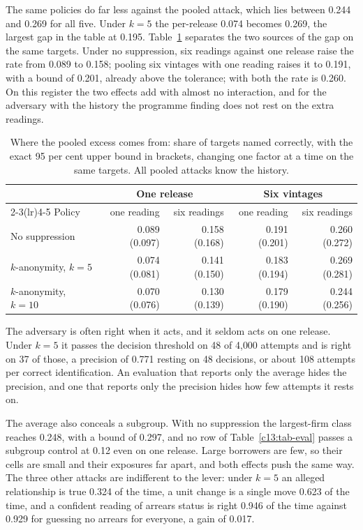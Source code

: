 The same policies do far less against the pooled attack, which lies between 0.244
and 0.269 for all five. Under $k=5$ the per-release 0.074 becomes 0.269, the largest
gap in the table at 0.195.
Table~\ref{c13:tab-decomp} separates the two sources of the gap on the same targets.
Under no suppression, six readings against one release raise the rate from 0.089 to
0.158; pooling six vintages with one reading raises it to 0.191, with a bound of
0.201, already above the tolerance; with both the rate is 0.260. On this register
the two effects add with almost no interaction, and for the adversary with the
history the programme finding does not rest on the extra readings.

\begin{table}[ht]
\centering
\caption{Where the pooled excess comes from: share of targets named correctly, with
the exact 95 per cent upper bound in brackets, changing one factor at a time on the
same targets. All pooled attacks know the history.}
\label{c13:tab-decomp}
\small\setlength{\tabcolsep}{4pt}
\begin{tabular}{lrrrr}
\toprule
 & \multicolumn{2}{c}{One release} & \multicolumn{2}{c}{Six vintages} \\
\cmidrule(lr){2-3}\cmidrule(lr){4-5}
Policy & one reading & six readings & one reading & six readings \\
\midrule
No suppression       & 0.089 (0.097) & 0.158 (0.168) & 0.191 (0.201) & 0.260 (0.272) \\
$k$-anonymity, $k=5$ & 0.074 (0.081) & 0.141 (0.150) & 0.183 (0.194) & 0.269 (0.281) \\
$k$-anonymity, $k=10$& 0.070 (0.076) & 0.130 (0.139) & 0.179 (0.190) & 0.244 (0.256) \\
\bottomrule
\end{tabular}
\end{table}

The adversary is often right when it acts, and it seldom acts on one release. Under
$k=5$ it passes the decision threshold on 48 of 4{,}000 attempts and is right on 37 of
those, a precision of 0.771 resting on 48 decisions, or about 108 attempts per
correct identification.
An evaluation that reports only the average hides the precision, and one that reports
only the precision hides how few attempts it rests on.

The average also conceals a subgroup. With no suppression the largest-firm class
reaches 0.248, with a bound of 0.297, and no row of Table~\ref{c13:tab-eval} passes a
subgroup control at 0.12 even on one release.
Large borrowers are few, so their cells are small and their exposures far apart, and
both effects push the same way. The three other attacks are indifferent to the lever:
under $k=5$ an alleged relationship is true 0.324 of the time, a unit change is a
single move 0.623 of the time, and a confident reading of arrears status is right
0.946 of the time against 0.929 for guessing no arrears for everyone, a gain of 0.017.

